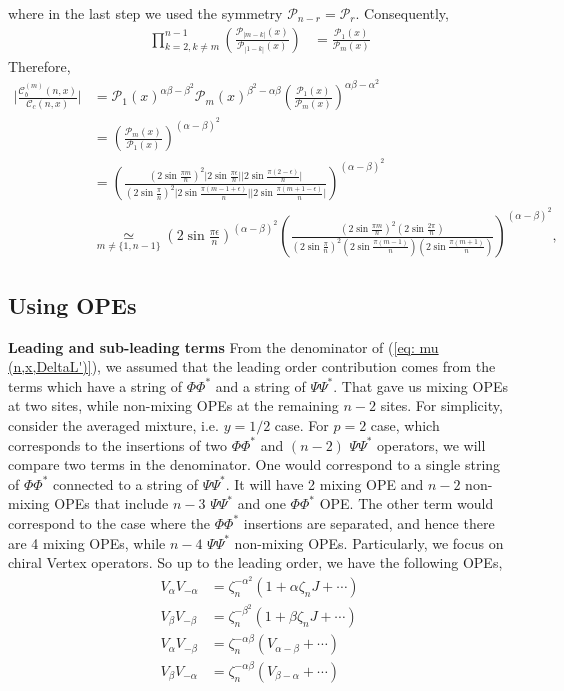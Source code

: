 \documentclass[11pt]{article}
\newcommand{\ep}{\epsilon}
\newcommand{\lb}{\left(}
\newcommand{\rb}{\right)}
\begin{document}
where in the last step we used the symmetry $\mathcal{P}_{n-r} = \mathcal{P}_r$.
Consequently,
\begin{align}
    \prod_{k = 2, k\neq m}^{n-1} \lb\frac{\mathcal{P}_{|m-k|}(x)}{\mathcal{P}_{|1-k|}(x)}\rb &= \frac{\mathcal{P}_1(x)}{\mathcal{P}_m(x)}
\end{align}
Therefore,
\begin{align}
    \Bigg|\frac{\mathcal{C}_b^{(m)}(n,x)
    }{\mathcal{C}_c(n,x)}\Bigg| &= \mathcal{P}_1(x)^{\alpha\beta-\beta^2} \mathcal{P}_m(x)^{\beta^2-\alpha\beta} \lb \frac{\mathcal{P}_1(x)}{\mathcal{P}_m(x)} \rb^{\alpha\beta - \alpha^2}\\
    &= \lb \frac{\mathcal{P}_m(x)}{\mathcal{P}_1(x)} \rb^{(\alpha-\beta)^2} \\
    &= \lb\frac{\lb2\sin \frac{\pi m}{n}\rb^2 \big|2\sin \frac{\pi \ep}{n}\big| \big|2\sin \frac{\pi (2-\ep)}{n}\big|}{\lb2\sin \frac{\pi }{n}\rb^2 \big|2\sin \frac{\pi (m-1+\ep)}{n}\big|\big|2\sin \frac{\pi (m+1-\ep)}{n}\big|}\rb^{(\alpha-\beta)^2} \\
    &\underset{m\neq \{1,n-1\}}{\simeq}\lb2\sin \frac{\pi \ep}{n}\rb^{(\alpha-\beta)^2}\lb\frac{\lb2\sin \frac{\pi m}{n}\rb^2  \lb 2\sin \frac{2\pi }{n}\rb}{\lb2\sin \frac{\pi }{n}\rb^2 \lb2\sin \frac{\pi (m-1)}{n}\rb\lb2\sin \frac{\pi (m+1)}{n}\rb}\rb^{(\alpha-\beta)^2}, 
\end{align}



\subsection{Using OPEs}
\textbf{Leading and sub-leading terms}
From the denominator of (\ref{eq: mu (n,x,DeltaL')}), we assumed that the leading order contribution comes from the terms which have a string of $\Phi \Phi^*$ and a string of $\Psi \Psi^*$. That gave us mixing OPEs at two sites, while non-mixing OPEs at the remaining $n-2$ sites. For simplicity, consider the averaged mixture, i.e. $y=1/2$ case. For $p=2$ case, which corresponds to the insertions of two $\Phi \Phi^*$ and  $(n-2)$ $\Psi \Psi^*$ operators, we will compare two terms in the denominator. One would correspond to a single string of $\Phi \Phi^*$ connected to a string of $\Psi \Psi^*$. It will have 2 mixing OPE and $n-2$ non-mixing OPEs that include $n-3$ $\Psi \Psi^*$ and one $\Phi \Phi^*$ OPE. The other term would correspond to the case where the $\Phi \Phi^*$ insertions are separated, and hence there are 4 mixing OPEs, while $n-4$ $\Psi \Psi^*$ non-mixing OPEs. Particularly, we focus on chiral Vertex operators. So up to the leading order, we have the following OPEs,
\begin{align}
    V_\alpha V_{-\alpha} &= \zeta_n^{-\alpha^2} \lb  1 + \alpha \zeta_n J + \cdots\rb \\
    V_\beta V_{-\beta} &= \zeta_n^{-\beta^2} \lb  1 + \beta \zeta_n J + \cdots\rb \\
    V_\alpha V_{-\beta} &= \zeta_n^{-\alpha\beta} \lb  V_{\alpha - \beta} + \cdots\rb \\
    V_\beta V_{-\alpha} &= \zeta_n^{-\alpha\beta} \lb  V_{\beta - \alpha} + \cdots\rb
\end{align}
\end{document}
